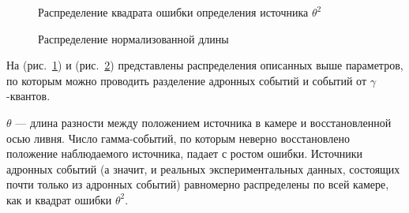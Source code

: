 \documentclass[magd,floatypics,numeref]{msudipl} %
\begin{document}
\begin{figure}[t]
	\noindent{}
	\caption{Распределение квадрата ошибки определения источника $\theta^2$}
	\label{pic:theta2dist}
\end{figure}
\begin{figure}[b]
	\noindent{}
	\caption{Распределение нормализованной длины}
	\label{pic:nwidthdist}
\end{figure}
 
На (рис.~\ref{pic:theta2dist}\afterpage{\clearpage}) и (рис.~\ref{pic:nwidthdist}\afterpage{\clearpage}) представлены распределения описанных выше параметров, по которым можно проводить разделение адронных событий и событий от $\gamma$-квантов.

 $\theta$ --- длина разности между положением источника в камере и восстановленной осью ливня. Число гамма-событий, по которым неверно восстановлено положение наблюдаемого источника, падает с ростом ошибки. Источники адронных событий (а значит, и реальных экспериментальных данных, состоящих почти только из адронных событий) равномерно распределены по всей камере, как и квадрат ошибки $\theta^2$.
\end{document}
